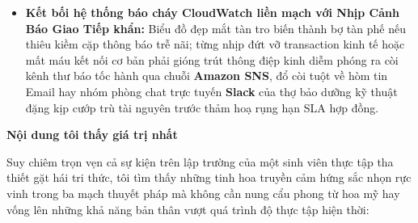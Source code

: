 \begin{itemize}
  điểm khi gánh lỗi, nhưng TUYỆT ĐỐI không thỏa mãn nhầm hoang tưởng
  rằng hệ thống kinh tế ứng dụng đang thực sự bưng nụ cười mãn nguyện
  trao tay khách hàng!
\item
  \textbf{Kết bối hệ thống báo cháy CloudWatch liền mạch với Nhịp Cảnh
  Báo Giao Tiếp khẩn:} Biểu đồ đẹp mắt tàn tro biến thành bợ tàn phế nếu
  thiêu kiềm cặp thông báo trễ nãi; từng nhịp đứt vỡ transaction kinh tế
  hoặc mất máu kết nối cơ bản phải gióng trút thông điệp kinh diễm phóng
  ra còi kênh thư báo tốc hành qua chuỗi \textbf{Amazon SNS}, đổ còi
  tuột về hòm tin Email hay nhóm phòng chat trực tuyến \textbf{Slack}
  của thợ bảo dưỡng kỹ thuật đặng kịp cướp trù tài nguyên trước thảm hoạ
  rụng hạn SLA hợp đồng.
\end{itemize}

\vspace{0.5em}\noindent\textbf{Nội dung tôi thấy giá trị
nhất}\par

Suy chiêm trọn vẹn cả sự kiện trên lập trường của một sinh viên thực tập
tha thiết gặt hái tri thức, tôi tìm thấy những tinh hoa truyền cảm hứng
sắc nhọn rực vinh trong ba mạch thuyết pháp mà không cần nung cẩu phong
từ hoa mỹ hay vống lên những khả năng bản thân vượt quá trình độ thực
tập hiện thời:


